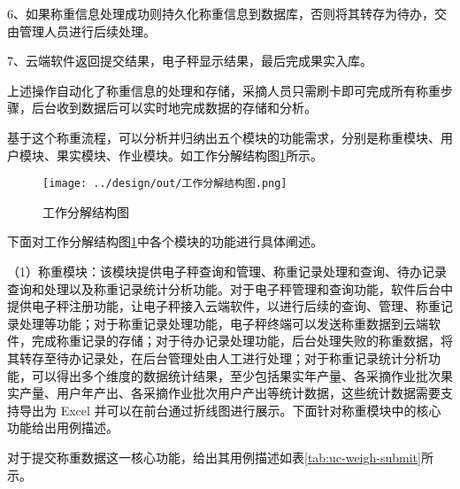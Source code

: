 6、如果称重信息处理成功则持久化称重信息到数据库，否则将其转存为待办，交由管理人员进行后续处理。

7、云端软件返回提交结果，电子秤显示结果，最后完成果实入库。

上述操作自动化了称重信息的处理和存储，采摘人员只需刷卡即可完成所有称重步骤，后台收到数据后可以实时地完成数据的存储和分析。

基于这个称重流程，可以分析并归纳出五个模块的功能需求，分别是称重模块、用户模块、果实模块、作业模块。如工作分解结构图\ref{fig:工作分解结构图}所示。

\begin{figure}[H]
    \centering
    \texttt{[image: ../design/out/工作分解结构图.png]}
    \caption{工作分解结构图}
    \label{fig:工作分解结构图}
\end{figure}

下面对工作分解结构图\ref{fig:工作分解结构图}中各个模块的功能进行具体阐述。

（1）称重模块：该模块提供电子秤查询和管理、称重记录处理和查询、待办记录查询和处理以及称重记录统计分析功能。对于电子秤管理和查询功能，软件后台中提供电子秤注册功能，让电子秤接入云端软件，以进行后续的查询、管理、称重记录处理等功能；对于称重记录处理功能，电子秤终端可以发送称重数据到云端软件，完成称重记录的存储；对于待办记录处理功能，后台处理失败的称重数据，将其转存至待办记录处，在后台管理处由人工进行处理；对于称重记录统计分析功能，可以得出多个维度的数据统计结果，至少包括果实年产量、各采摘作业批次果实产量、用户年产出、各采摘作业批次用户产出等统计数据，这些统计数据需要支持导出为 Excel 并可以在前台通过折线图进行展示。下面针对称重模块中的核心功能给出用例描述。

对于提交称重数据这一核心功能，给出其用例描述如表\ref{tab:uc-weigh-submit}所示。

